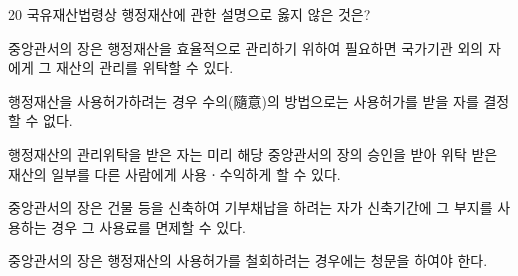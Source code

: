 \begin{question}{20}
국유재산법령상 행정재산에 관한 설명으로 옳지 않은 것은?
\begin{choices}
  \item 중앙관서의 장은 행정재산을 효율적으로 관리하기 위하여 필요하면 국가기관 외의 자에게 그 재산의 관리를 위탁할 수 있다.
  \item 행정재산을 사용허가하려는 경우 수의(隨意)의 방법으로는 사용허가를 받을 자를 결정할 수 없다.
  \item 행정재산의 관리위탁을 받은 자는 미리 해당 중앙관서의 장의 승인을 받아 위탁 받은 재산의 일부를 다른 사람에게 사용ㆍ수익하게 할 수 있다.
  \item 중앙관서의 장은 건물 등을 신축하여 기부채납을 하려는 자가 신축기간에 그 부지를 사용하는 경우 그 사용료를 면제할 수 있다.
  \item 중앙관서의 장은 행정재산의 사용허가를 철회하려는 경우에는 청문을 하여야 한다.
\end{choices}
\end{question}
